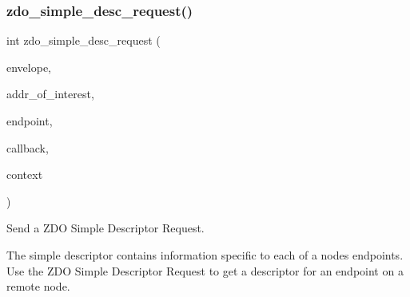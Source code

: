 \mbox{\label{group__zdo_gafbbece379bc09af360099d1e0825d507}} 
\subsubsection{\texorpdfstring{zdo\+\_\+simple\+\_\+desc\+\_\+request()}{zdo\_simple\_desc\_request()}}
{\footnotesize\ttfamily int zdo\+\_\+simple\+\_\+desc\+\_\+request (\begin{DoxyParamCaption}\item[{\hyperlink{structwpan__envelope__t}{wpan\+\_\+envelope\+\_\+t} $\ast$}]{envelope,  }\item[{\hyperlink{group__hal__dos_ga5a8b2dc9e45a9ee81a94ef304fb62505}{uint16\+\_\+t}}]{addr\+\_\+of\+\_\+interest,  }\item[{uint\+\_\+fast8\+\_\+t}]{endpoint,  }\item[{\hyperlink{group__wpan__aps_gabf0a6b85c9ff3ff9104c8b58c1436d72}{wpan\+\_\+response\+\_\+fn}}]{callback,  }\item[{const void \hyperlink{group__hal_gaef060b3456fdcc093a7210a762d5f2ed}{F\+AR} $\ast$}]{context }\end{DoxyParamCaption})}



Send a Z\+DO Simple Descriptor Request. 

The simple descriptor contains information specific to each of a node\textquotesingle{}s endpoints. Use the Z\+DO Simple Descriptor Request to get a descriptor for an endpoint on a remote node.


